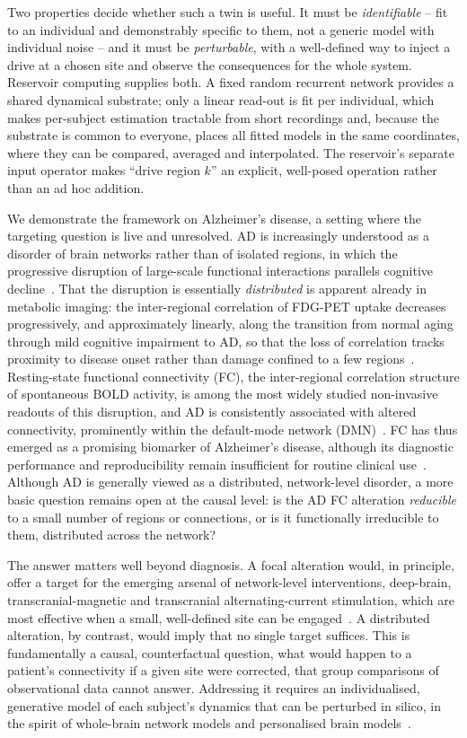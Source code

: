 \documentclass[11pt]{article}
\begin{document}
Two properties decide whether such a twin is useful. It must be
\emph{identifiable} -- fit to an individual and demonstrably specific to them,
not a generic model with individual noise -- and it must be \emph{perturbable},
with a well-defined way to inject a drive at a chosen site and observe the
consequences for the whole system. Reservoir computing supplies both. A fixed
random recurrent network provides a shared dynamical substrate; only a linear
read-out is fit per individual, which makes per-subject estimation tractable from
short recordings and, because the substrate is common to everyone, places all
fitted models in the same coordinates, where they can be compared, averaged and
interpolated. The reservoir's separate input operator makes ``drive region $k$''
an explicit, well-posed operation rather than an ad hoc addition.

We demonstrate the framework on Alzheimer's disease, a setting where the
targeting question is live and unresolved. AD is increasingly understood as a
disorder of brain networks rather than of isolated regions, in which the
progressive disruption of large-scale functional interactions parallels cognitive
decline~\cite{seeley2009,delbeuck2003}.
That the disruption is essentially \emph{distributed} is apparent already in
metabolic imaging: the inter-regional correlation of FDG-PET uptake decreases
progressively, and approximately linearly, along the transition from normal
aging through mild cognitive impairment to AD, so that the loss of correlation
tracks proximity to disease onset rather than damage confined to a few
regions~\cite{pagani2016,pagani2017}.
Resting-state functional connectivity (FC), the inter-regional correlation
structure of spontaneous BOLD activity, is
among the most widely studied non-invasive readouts of this disruption, and AD
is consistently associated with altered connectivity, prominently within the
default-mode network (DMN)~\cite{greicius2004,sheline2013}. FC has thus emerged as a
promising biomarker of Alzheimer's disease, although its diagnostic performance
and reproducibility remain insufficient for routine clinical
use~\cite{buckner2013}. Although AD is generally
viewed as a distributed, network-level disorder, a more basic question remains
open at the causal level: is the AD FC alteration \emph{reducible} to a small
number of regions or connections, or is it functionally irreducible to them,
distributed across the network?

The answer matters well beyond diagnosis. A focal alteration would, in
principle, offer a target for the emerging arsenal of network-level
interventions, deep-brain, transcranial-magnetic and transcranial
alternating-current stimulation, which are most effective when a small,
well-defined site can be engaged~\cite{fox2014}. A
distributed alteration, by contrast, would imply that no single target suffices.
This is fundamentally a causal, counterfactual question, what would happen to a
patient's connectivity if a given site were corrected, that group comparisons
of observational data cannot answer. Addressing it requires an individualised,
generative model of each subject's dynamics that can be perturbed in silico, in
the spirit of whole-brain network models and personalised brain
models~\cite{honey2009,deco2011,sanzleon2013,jirsa2017,wang2019}.
\end{document}
